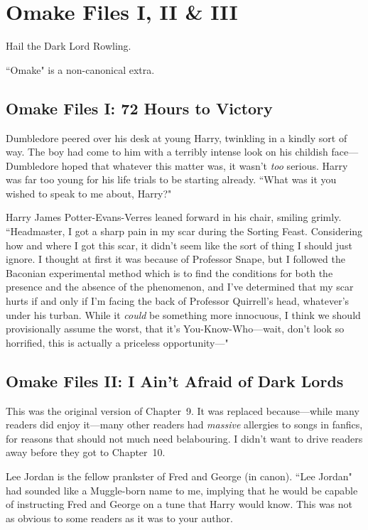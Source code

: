 \chapter{Omake Files I, II \& III}

\begin{chapterOpeningAuthorNote}
Hail the Dark Lord Rowling.

``Omake" is a non-canonical extra.
\end{chapterOpeningAuthorNote}

\section{Omake Files I: 72 Hours to Victory}

Dumbledore peered over his desk at young Harry, twinkling in a kindly sort of way. The boy had come to him with a terribly intense look on his childish face—Dumbledore hoped that whatever this matter was, it wasn't \emph{too} serious. Harry was far too young for his life trials to be starting already. ``What was it you wished to speak to me about, Harry?"

Harry James Potter-Evans-Verres leaned forward in his chair, smiling grimly. ``Headmaster, I got a sharp pain in my scar during the Sorting Feast. Considering how and where I got this scar, it didn't seem like the sort of thing I should just ignore. I thought at first it was because of Professor Snape, but I followed the Baconian experimental method which is to find the conditions for both the presence and the absence of the phenomenon, and I've determined that my scar hurts if and only if I'm facing the back of Professor Quirrell's head, whatever's under his turban. While it \emph{could} be something more innocuous, I think we should provisionally assume the worst, that it's You-Know-Who—wait, don't look so horrified, this is actually a priceless opportunity—"

\section{Omake Files II: I Ain't Afraid of Dark Lords}

This was the original version of Chapter~9. It was replaced because—while many readers did enjoy it—many other readers had \emph{massive} allergies to songs in fanfics, for reasons that should not much need belabouring. I didn't want to drive readers away before they got to Chapter~10.

Lee Jordan is the fellow prankster of Fred and George (in canon). ``Lee Jordan" had sounded like a Muggle-born name to me, implying that he would be capable of instructing Fred and George on a tune that Harry would know. This was not as obvious to some readers as it was to your author.

